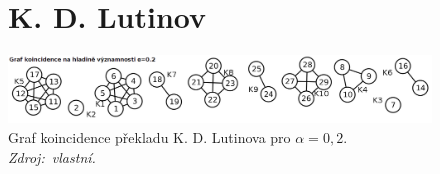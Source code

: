\documentclass[dp.tex]{subfiles}
\begin{document}
\begin{figure}[h]
	\vspace*{1.5cm}

\section*{K. D. Lutinov}
	\centering
	\includegraphics[max width=\textwidth,keepaspectratio=true]{imgs-99-priloha-d/d_k_20}
	\caption[Graf koincidence překladu K. D. Lutinova pro $\alpha = 0{,}2$]
            {Graf koincidence překladu K. D. Lutinova pro $\alpha = 0{,}2$. \textit{Zdroj:~vlastní.}}
	\label{fig:d_k_20}
\end{figure}
\end{document}
